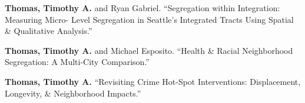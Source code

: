 \begin{cvparagraph}

\textbf{Thomas, Timothy A.} and Ryan Gabriel. “Segregation within Integration: Measuring Micro- Level Segregation in Seattle's Integrated Tracts Using Spatial \& Qualitative Analysis.”
\end{cvparagraph}

\begin{cvparagraph}

\textbf{Thomas, Timothy A.} and Michael Esposito. “Health \& Racial Neighborhood Segregation: A Multi-City Comparison.”
\end{cvparagraph}

\begin{cvparagraph}

\textbf{Thomas, Timothy A.} “Revisiting Crime Hot-Spot Interventions: Displacement, Longevity, \& Neighborhood Impacts.”
\end{cvparagraph}